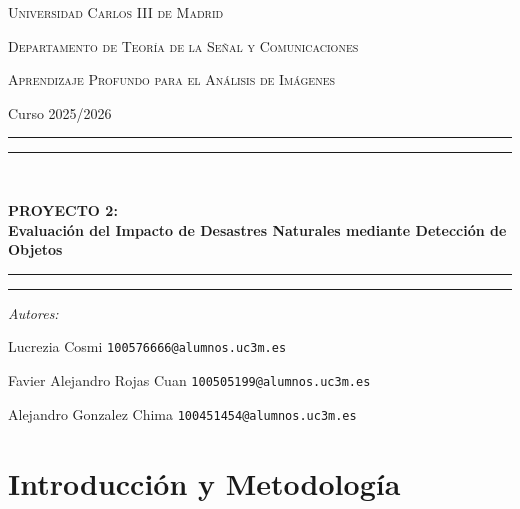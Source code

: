 \documentclass[11pt, a4paper]{article}
\begin{document}
\begin{titlepage}
    \centering
    \vspace*{2cm}
    
    {\scshape\Large Universidad Carlos III de Madrid \par}
    \vspace{0.5cm}
    {\scshape\large Departamento de Teoría de la Señal y Comunicaciones \par}
    \vspace{2cm}
    
    {\scshape\Large Aprendizaje Profundo para el Análisis de Imágenes  \par}
    \vspace{0.5cm}
    {\large Curso 2025/2026 \par}
    
    \vspace{3cm}
    \rule{\textwidth}{0.4pt}\vspace*{-\baselineskip}\vspace{3.2pt}
    \rule{\textwidth}{1.6pt}\\[\baselineskip]
    {\huge\bfseries PROYECTO 2:\\[0.5cm] Evaluación del Impacto de Desastres Naturales mediante Detección de Objetos \par}
    \vspace{0.2cm}
    \rule{\textwidth}{1.6pt}\vspace*{-\baselineskip}\vspace{3.2pt}
    \rule{\textwidth}{0.4pt}
    
    \vspace{3cm}
    
    {\Large\itshape Autores:\par}
    \vspace{0.5cm}
    {\Large  Lucrezia Cosmi \quad \texttt{100576666@alumnos.uc3m.es}\par}
    {\Large  Favier Alejandro Rojas Cuan \quad \texttt{100505199@alumnos.uc3m.es}\par}
    {\Large  Alejandro Gonzalez Chima \quad \texttt{100451454@alumnos.uc3m.es}\par}
    
    \vfill
\end{titlepage}

\newpage

\section{Introducción y Metodología}
\end{document}
